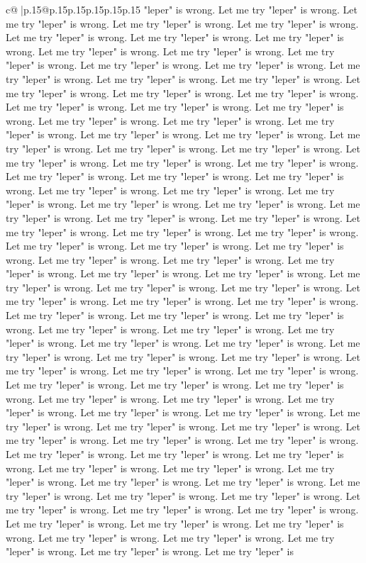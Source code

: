 \documentclass{article}
\begin{document}
{\begin{supertabular}{c@{$\;$}|p{.15\linewidth}@{}p{.15\linewidth}p{.15\linewidth}p{.15\linewidth}p{.15\linewidth}p{.15\linewidth}}
{{{"leper" is wrong. Let me try "leper" is wrong. Let me try "leper" is wrong. Let me try "leper" is wrong. Let me try "leper" is wrong. Let me try "leper" is wrong. Let me try "leper" is wrong. Let me try "leper" is wrong. Let me try "leper" is wrong. Let me try "leper" is wrong. Let me try "leper" is wrong. Let me try "leper" is wrong. Let me try "leper" is wrong. Let me try "leper" is wrong. Let me try "leper" is wrong. Let me try "leper" is wrong. Let me try "leper" is wrong. Let me try "leper" is wrong. Let me try "leper" is wrong. Let me try "leper" is wrong. Let me try "leper" is wrong. Let me try "leper" is wrong. Let me try "leper" is wrong. Let me try "leper" is wrong. Let me try "leper" is wrong. Let me try "leper" is wrong. Let me try "leper" is wrong. Let me try "leper" is wrong. Let me try "leper" is wrong. Let me try "leper" is wrong. Let me try "leper" is wrong. Let me try "leper" is wrong. Let me try "leper" is wrong. Let me try "leper" is wrong. Let me try "leper" is wrong. Let me try "leper" is wrong. Let me try "leper" is wrong. Let me try "leper" is wrong. Let me try "leper" is wrong. Let me try "leper" is wrong. Let me try "leper" is wrong. Let me try "leper" is wrong. Let me try "leper" is wrong. Let me try "leper" is wrong. Let me try "leper" is wrong. Let me try "leper" is wrong. Let me try "leper" is wrong. Let me try "leper" is wrong. Let me try "leper" is wrong. Let me try "leper" is wrong. Let me try "leper" is wrong. Let me try "leper" is wrong. Let me try "leper" is wrong. Let me try "leper" is wrong. Let me try "leper" is wrong. Let me try "leper" is wrong. Let me try "leper" is wrong. Let me try "leper" is wrong. Let me try "leper" is wrong. Let me try "leper" is wrong. Let me try "leper" is wrong. Let me try "leper" is wrong. Let me try "leper" is wrong. Let me try "leper" is wrong. Let me try "leper" is wrong. Let me try "leper" is wrong. Let me try "leper" is wrong. Let me try "leper" is wrong. Let me try "leper" is wrong. Let me try "leper" is wrong. Let me try "leper" is wrong. Let me try "leper" is wrong. Let me try "leper" is wrong. Let me try "leper" is wrong. Let me try "leper" is wrong. Let me try "leper" is wrong. Let me try "leper" is wrong. Let me try "leper" is wrong. Let me try "leper" is wrong. Let me try "leper" is wrong. Let me try "leper" is wrong. Let me try "leper" is wrong. Let me try "leper" is wrong. Let me try "leper" is wrong. Let me try "leper" is wrong. Let me try "leper" is wrong. Let me try "leper" is wrong. Let me try "leper" is wrong. Let me try "leper" is wrong. Let me try "leper" is wrong. Let me try "leper" is wrong. Let me try "leper" is wrong. Let me try "leper" is wrong. Let me try "leper" is wrong. Let me try "leper" is wrong. Let me try "leper" is wrong. Let me try "leper" is wrong. Let me try "leper" is wrong. Let me try "leper" is wrong. Let me try "leper" is wrong. Let me try "leper" is wrong. Let me try "leper" is wrong. Let me try "leper" is wrong. Let me try "leper" is wrong. Let me try "leper" is wrong. Let me try "leper" is wrong. Let me try "leper" is wrong. Let me try "leper" is wrong. Let me try "leper" is wrong. Let me try "leper" is wrong. Let me try "leper" is }}}
\end{supertabular}}
\end{document}
